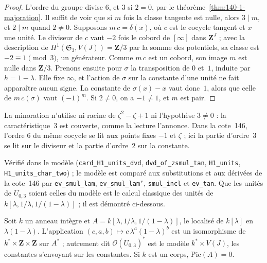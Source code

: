\begin{proof}
L'ordre du groupe divise $6$, et $3$ si $2 = 0$, par le théorème~\ref{thm:140-1-majoration}. Il suffit de voir que si $m$ fois la classe tangente est nulle, alors $3 \mid m$, et $2 \mid m$ quand $2 \neq 0$. Supposons $m\,c = \delta(x)$, où $c$ est le cocycle tangent et $x$ une unité. Le diviseur de $c$ vaut $-2$ fois le cobord de $[\infty]$ dans $\mathbf Z^J$ ; avec la description de $H^1(\mathfrak S_3, V(J)) = \mathbf Z/3$ par la somme des potentiels, sa classe est $-2 \equiv 1 \pmod 3$, un générateur. Comme $m\,c$ est un cobord, son image $m$ est nulle dans $\mathbf Z/3$. Prenons ensuite pour $\sigma$ la transposition de $0$ et~$1$, induite par $h = 1 - \lambda$. Elle fixe $\infty$, et l'action de $\sigma$ sur la constante d'une unité ne fait apparaître aucun signe. La constante de $\sigma(x) - x$ vaut donc~$1$, alors que celle de $m\,c(\sigma)$ vaut $(-1)^m$. Si $2 \neq 0$, on a $-1 \neq 1$, et $m$ est pair.
\end{proof}

La minoration n'utilise ni racine de $\zeta^2 - \zeta + 1$ ni l'hypothèse $3 \neq 0$ : la caractéristique~$3$ est couverte, comme la lecture l'annonce. Dans la cote~146, l'ordre $6$ du même cocycle se lit aux points fixes $-1$ et $\zeta$ ; ici la partie d'ordre~$3$ se lit sur le diviseur et la partie d'ordre~$2$ sur la constante.

\begin{sloppypar}
\noindent Vérifié dans le modèle (\texttt{card\_H1\_units\_dvd}, \texttt{dvd\_of\_zsmul\_tan}, \texttt{H1\_units}, \texttt{H1\_units\_char\_two}) ; le modèle est comparé aux substitutions et aux dérivées de la cote~146 par \texttt{ev\_smul\_lam}, \texttt{ev\_smul\_lam'}, \texttt{smul\_incl} et \texttt{ev\_tan}. Que les unités de $U_{0,3}$ soient celles du modèle est le calcul classique des unités de $k[\lambda, 1/\lambda, 1/(1-\lambda)]$ ; il est démontré ci-dessous.
\end{sloppypar}

\begin{encadre}
\begin{theoreme}\label{thm:140-1-unites}
Soit $k$ un anneau intègre et $A = k[\lambda, 1/\lambda, 1/(1-\lambda)]$, le localisé de $k[\lambda]$ en $\lambda(1-\lambda)$. L'application $(c, a, b) \mapsto c\,\lambda^a(1-\lambda)^b$ est un isomorphisme de $k^* \times \mathbf Z \times \mathbf Z$ sur $A^*$ ; autrement dit $\mathcal O(U_{0,3})^*$ est le modèle $k^* \times V(J)$, les constantes s'envoyant sur les constantes. Si $k$ est un corps, $\mathrm{Pic}(A) = 0$.
\end{theoreme}
\end{encadre}

